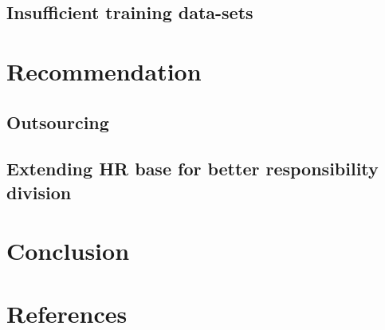 \documentclass[12pt,a4paper]{scrreprt}
\begin{document}
\section{Insufficient training data-sets}

\chapter{Recommendation}
\section{Outsourcing}
\section{Extending HR base for better responsibility division}

\chapter{Conclusion}
\chapter*{References}

\end{document}
